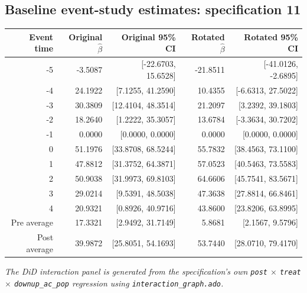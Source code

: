 \documentclass[10pt]{article}
\begin{document}
\subsection*{Baseline event-study estimates: specification 11}
\begin{center}
\scriptsize
\begin{tabular}{r rr rr}
\toprule
Event time & Original $\hat\beta$ & Original 95\% CI & Rotated $\hat\beta$ & Rotated 95\% CI \\
\midrule
-5 & -3.5087 & [-22.6703, 15.6528] & -21.8511 & [-41.0126, -2.6895] \\
-4 & 24.1922 & [7.1255, 41.2590] & 10.4355 & [-6.6313, 27.5022] \\
-3 & 30.3809 & [12.4104, 48.3514] & 21.2097 & [3.2392, 39.1803] \\
-2 & 18.2640 & [1.2222, 35.3057] & 13.6784 & [-3.3634, 30.7202] \\
-1 & 0.0000 & [0.0000, 0.0000] & 0.0000 & [0.0000, 0.0000] \\
0 & 51.1976 & [33.8708, 68.5244] & 55.7832 & [38.4563, 73.1100] \\
1 & 47.8812 & [31.3752, 64.3871] & 57.0523 & [40.5463, 73.5583] \\
2 & 50.9038 & [31.9973, 69.8103] & 64.6606 & [45.7541, 83.5671] \\
3 & 29.0214 & [9.5391, 48.5038] & 47.3638 & [27.8814, 66.8461] \\
4 & 20.9321 & [0.8926, 40.9716] & 43.8600 & [23.8206, 63.8995] \\
\midrule
Pre average & 17.3321 & [2.9492, 31.7149] & 5.8681 & [2.1567, 9.5796] \\
Post average & 39.9872 & [25.8051, 54.1693] & 53.7440 & [28.0710, 79.4170] \\
\bottomrule
\end{tabular}
\end{center}
\medskip
\textit{The DiD interaction panel is generated from the specification's own \texttt{post} $\times$ \texttt{treat} $\times$ \texttt{downup\_ac\_pop} regression using \texttt{interaction\_graph.ado}.}
\clearpage
\end{document}
